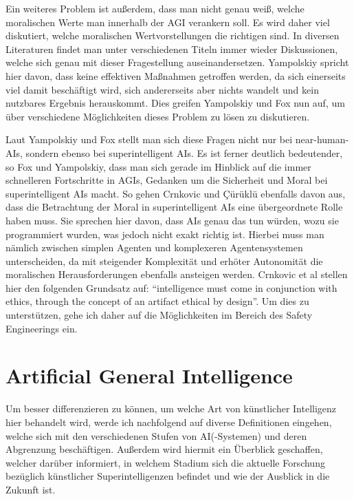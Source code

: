             Ein weiteres Problem ist außerdem, dass man nicht genau weiß, welche moralischen Werte man
            innerhalb der AGI verankern soll.\cite[p. 1]{yampolskiy2013safety} Es wird daher viel
            diskutiert, welche moralischen Wertvorstellungen die richtigen sind. In diversen Literaturen
            findet man unter verschiedenen Titeln immer wieder Diskussionen, welche sich genau mit dieser
            Fragestellung auseinandersetzen. Yampolskiy spricht hier davon, dass keine effektiven
            Maßnahmen getroffen werden, da sich einerseits viel damit beschäftigt wird, sich andererseits
            aber nichts wandelt und kein nutzbares Ergebnis herauskommt.\cite[p. 1]{yampolskiy2013safety}
            Dies greifen Yampolskiy und Fox nun auf, um über verschiedene Möglichkeiten dieses Problem zu
            lösen zu diskutieren.

            Laut Yampolskiy und Fox stellt man sich diese Fragen nicht nur bei near-human-AIs, sondern
            ebenso bei superintelligent AIs.\cite[p. 2]{yampolskiy2013safety} Es ist ferner deutlich
            bedeutender, so Fox und Yampolskiy, dass man sich gerade im Hinblick auf die immer schnelleren
            Fortschritte in AGIs, Gedanken um die Sicherheit und Moral bei superintelligent AIs macht.
            So gehen Crnkovic und {\c{C}}{\"u}r{\"u}kl{\"u} ebenfalls davon aus, dass die Betrachtung
            der Moral in superintelligent AIs eine übergeordnete Rolle haben muss.\cite[p. 1]{crnkovic2012robots}
            Sie sprechen hier davon, dass AIs genau das tun würden, wozu sie programmiert
            wurden, was jedoch nicht exakt richtig ist. Hierbei muss man nämlich zwischen simplen Agenten
            und komplexeren Agentensystemen unterscheiden, da mit steigender Komplexität und erhöter
            Autonomität die moralischen Herausforderungen ebenfalls ansteigen werden. Crnkovic et al
            stellen hier den folgenden Grundsatz auf: ``intelligence must come in conjunction with ethics,
            through the concept of an artifact ethical by design''. Um dies zu unterstützen, gehe ich daher
            auf die Möglichkeiten im Bereich des Safety Engineerings ein.

    \section{Artificial General Intelligence}
        Um besser differenzieren zu können, um welche Art von künstlicher Intelligenz hier behandelt
        wird, werde ich nachfolgend auf diverse Definitionen eingehen, welche sich mit den verschiedenen
        Stufen von AI(-Systemen) und deren Abgrenzung beschäftigen. Außerdem wird hiermit ein Überblick geschaffen,
        welcher darüber informiert, in welchem Stadium sich die aktuelle Forschung bezüglich künstlicher
        Superintelligenzen befindet und wie der Ausblick in die Zukunft ist.

